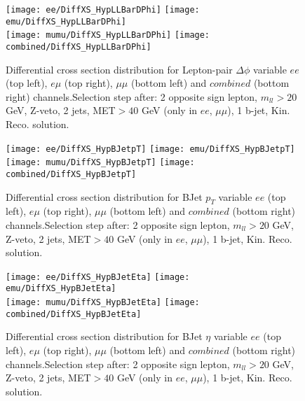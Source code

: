 \documentclass[12pt, a4paper, titlepage]{article}
\begin{document}
\clearpage
\newpage

\begin{figure}
  \texttt{[image: ee/DiffXS\_HypLLBarDPhi]}
  \texttt{[image: emu/DiffXS\_HypLLBarDPhi]}\\
  \texttt{[image: mumu/DiffXS\_HypLLBarDPhi]}
  \texttt{[image: combined/DiffXS\_HypLLBarDPhi]}
\caption{Differential cross section distribution for  Lepton-pair $\Delta\phi$ variable  $ee$ (top left), $e\mu$ (top right), $\mu\mu$ (bottom left) and $combined$ (bottom right) channels.\newline Selection step after: 2 opposite sign lepton, $m_{ll}>20$ GeV, Z-veto, 2 jets, MET$>40$ GeV (only in $ee$, $\mu\mu$), 1 b-jet, Kin. Reco. solution.}
\end{figure}

\clearpage
\newpage


\begin{figure}
  \texttt{[image: ee/DiffXS\_HypBJetpT]}
  \texttt{[image: emu/DiffXS\_HypBJetpT]}\\
  \texttt{[image: mumu/DiffXS\_HypBJetpT]}
  \texttt{[image: combined/DiffXS\_HypBJetpT]}
\caption{Differential cross section distribution for  BJet $p_T$ variable  $ee$ (top left), $e\mu$ (top right), $\mu\mu$ (bottom left) and $combined$ (bottom right) channels.\newline Selection step after: 2 opposite sign lepton, $m_{ll}>20$ GeV, Z-veto, 2 jets, MET$>40$ GeV (only in $ee$, $\mu\mu$), 1 b-jet, Kin. Reco. solution.}
\end{figure}

\clearpage
\newpage

\begin{figure}
  \texttt{[image: ee/DiffXS\_HypBJetEta]}
  \texttt{[image: emu/DiffXS\_HypBJetEta]}\\
  \texttt{[image: mumu/DiffXS\_HypBJetEta]}
  \texttt{[image: combined/DiffXS\_HypBJetEta]}
\caption{Differential cross section distribution for  BJet $\eta$ variable  $ee$ (top left), $e\mu$ (top right), $\mu\mu$ (bottom left) and $combined$ (bottom right) channels.\newline Selection step after: 2 opposite sign lepton, $m_{ll}>20$ GeV, Z-veto, 2 jets, MET$>40$ GeV (only in $ee$, $\mu\mu$), 1 b-jet, Kin. Reco. solution.}
\end{figure}
\end{document}
